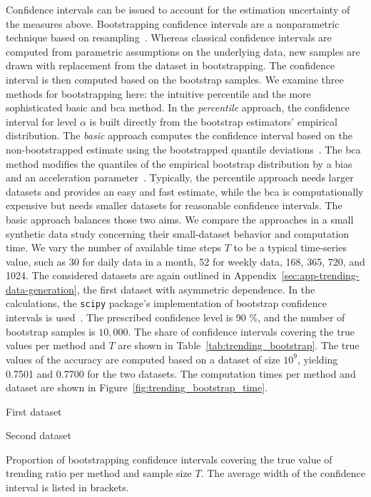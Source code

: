 Confidence intervals can be issued to account for the estimation uncertainty of the measures above.
Bootstrapping confidence intervals are a nonparametric technique based on resampling~\parencite[for introductions see][]{Hesterberg2011,Bittmann2021}.
Whereas classical confidence intervals are computed from parametric assumptions on the underlying data, new samples are drawn with replacement from the dataset in bootstrapping.
The confidence interval is then computed based on the bootstrap samples.
We examine three methods for bootstrapping here: the intuitive percentile and the more sophisticated basic and \ac{bca} method.
In the \textit{percentile} approach, the confidence interval for level $\alpha$ is built directly from the bootstrap estimators' empirical distribution.
The \textit{basic} approach computes the confidence interval based on the non-bootstrapped estimate using the bootstrapped quantile deviations~\parencite{Davison1997}.
The \ac{bca} method modifies the quantiles of the empirical bootstrap distribution by a bias and an acceleration parameter~\parencite{Efron1987}.
Typically, the percentile approach needs larger datasets and provides an easy and fast estimate, while the \ac{bca} is computationally expensive but needs smaller datasets for reasonable confidence intervals.
The basic approach balances those two aims.
We compare the approaches in a small synthetic data study concerning their small-dataset behavior and computation time.
We vary the number of available time steps $T$ to be a typical time-series value, such as 30 for daily data in a month, 52 for weekly data, 168, 365, 720, and 1024.
The considered datasets are again outlined in Appendix~\ref{sec:app-trending-data-generation}, the first dataset with asymmetric dependence.
In the calculations, the \verb|scipy| package's implementation of bootstrap confidence intervals is used~\parencite{Virtanen2020}.
The prescribed confidence level is 90 \%, and the number of bootstrap samples is $10,000$.
The share of confidence intervals covering the true values per method and $T$ are shown in Table~\ref{tab:trending_bootstrap}.
The true values of the accuracy are computed based on a dataset of size $10^9$, yielding 0.7501 and 0.7700 for the two datasets.
The computation times per method and dataset are shown in Figure~\ref{fig:trending_bootstrap_time}.

\begin{table}
    \centering
    \begin{subtable}{.48\textwidth}
        
        \caption{First dataset}
    \end{subtable}\hspace{0.02\textwidth}
    \begin{subtable}{.48\textwidth}
        
        \caption{Second dataset}
    \end{subtable}
    \caption{Proportion of bootstrapping confidence intervals covering the true value of trending ratio per method and sample size $T$. The average width of the confidence interval is listed in brackets.}
    \label{tab:trending_bootstrap}
\end{table}

